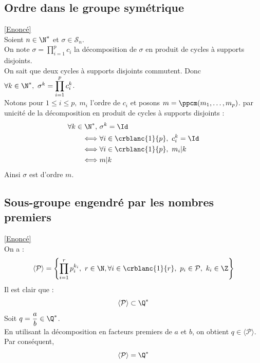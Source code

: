 \documentclass[8pt]{book}
\begin{document}
	\subsection{Ordre dans le groupe symétrique }
	\label{Ordre dans le groupe symétrique corrigé}
	\textcolor{blue}{\hyperref[Ordre dans le groupe symétrique]{[Enoncé]}}\\
	Soient $n\in \N^*$ et $\sigma\in \mathcal S_n$.\\
	On note $\sigma=\displaystyle\prod_{i=1}^pc_i$ la décomposition de $\sigma$ en produit de cycles à supports disjoints.\\
	On sait que deux cycles à supports disjoints commutent. Donc $\forall k\in \N^*,\ \sigma^k=\displaystyle\prod_{i=1}^pc_i^k$.\\
	Notons pour $1\leq i\leq p,\ m_i$ l'ordre de $c_i$ et posons $m=\ppcm(m_1,\dots,m_p)$. par unicité de la décomposition en produit de cycles à supports disjoints :
	\begin{align*}
		\forall k\in \N^*,\ &\sigma^k=\Id\\
		\iff&\forall i\in \crblanc{1}{p},\ c_i^k=\Id\\
		\iff&\forall i\in \crblanc{1}{p},\ m_i|k\\
		\iff& m|k
	\end{align*}
	Ainsi $\sigma$ est d'ordre $m$.
	
	\subsection{Sous-groupe engendré par les nombres premiers }
	\label{Sous-groupe engendré par les nombres premiers corrigé}
	\textcolor{blue}{\hyperref[Sous-groupe engendré par les nombres premiers]{[Enoncé]}}\\
	On a : \[\langle \mathcal{P}\rangle=\left\{\prod_{i=1}^{r}p_i^{k_i},\ r\in\N,\forall i\in\crblanc{1}{r},\ p_i\in \mathcal P,\ k_i\in\Z\right\}\]
	Il est clair que : \[\langle \mathcal P\rangle \subset \Q^*\]
	Soit $q=\dfrac{a}{b}\in \Q^*$.\\
	En utilisant la décomposition en facteurs premiers de $a$ et $b$, on obtient $q\in \langle \mathcal P\rangle$.\\
	Par conséquent, \[\langle \mathcal P\rangle=\Q^*\]
	
\end{document}
